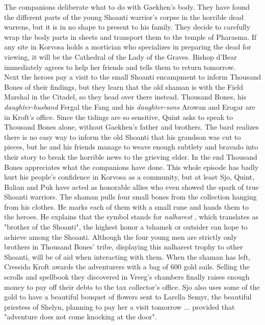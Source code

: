 The companions deliberate what to do with Gaekhen's body. They have found the different parts of the young Shoanti warrior's corpse in the horrible dead warrens, but it is in no shape to present to his family. They decide to carefully wrap the body parts in sheets and transport them to the temple of Pharasma. If any site in Korvosa holds a mortician who specializes in preparing the dead for viewing, it will be the Cathedral of the Lady of the Graves. Bishop d'Bear immediately agrees to help her friends and tells them to return tomorrow.\\

Next the heroes pay a visit to the small Shoanti encampment to inform Thousand Bones of their findings, but they learn that the old shaman is with the Field Marshal in the Citadel, so they head over there instead. Thousand Bones, his {\itshape daughter-husband} Fergal the Fang and his  {\itshape daughter-sons} Arowan and Erogar are in Kroft's office. Since the tidings are so sensitive, Quint asks to speak to Thousand Bones alone, without Gaekhen's father and brothers. The bard realizes there is no easy way to inform the old Shoanti that his grandson was cut to pieces, but he and his friends manage to weave enough subtlety and bravado into their story to break the horrible news to the grieving elder. In the end Thousand Bones appreciates what the companions have done. This whole episode has badly hurt his people's confidence in Korvosa as a community, but at least Sjo, Quint, Balian and Puk have acted as honorable allies who even showed the spark of true Shoanti warriors. The shaman pulls four small bones from the collection hanging from his clothes. He marks each of them with a small rune and hands them to the heroes. He explains that the symbol stands for {\itshape nalharest} , which translates as "brother of the Shoanti", the highest honor a tshamek or outsider can hope to achieve among the Shoanti. Although the four young men are strictly only brothers in Thousand Bones' tribe, displaying this nalharest trophy to other Shoanti, will be of aid when interacting with them. When the shaman has left, Cressida Kroft awards the adventurers with a bag of 600 gold sails. Selling the scrolls and spellbook they discovered in Vreeg's chambers finally raises enough money to pay off their debts to the tax collector's office. Sjo also uses some of the gold to have a beautiful bouquet of flowers sent to Larella Semyr, the beautiful priestess of Shelyn, planning to pay her a visit tomorrow ... provided that "adventure does not come knocking at the door".\\

